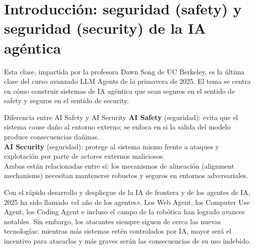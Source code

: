 \section{Introducción: seguridad (safety) y seguridad (security) de la IA agéntica}

Esta clase, impartida por la profesora Dawn Song de UC Berkeley, es la última clase del curso avanzado LLM Agents de la primavera de 2025. El tema se centra en cómo construir sistemas de IA agéntica que sean seguros en el sentido de safety y seguros en el sentido de security.

\begin{knowledgebox}{Diferencia entre AI Safety y AI Security}
\textbf{AI Safety} (seguridad): evita que el sistema cause daño al entorno externo; se enfoca en si la salida del modelo produce consecuencias dañinas.\\
\textbf{AI Security} (seguridad): protege al sistema mismo frente a ataques y explotación por parte de actores externos maliciosos.\\
Ambas están relacionadas entre sí: los mecanismos de alineación (alignment mechanisms) necesitan mantenerse robustos y seguros en entornos adversariales.
\end{knowledgebox}

Con el rápido desarrollo y despliegue de la IA de frontera y de los agentes de IA, 2025 ha sido llamado «el año de los agentes». Los Web Agent, los Computer Use Agent, los Coding Agent e incluso el campo de la robótica han logrado avances notables. Sin embargo, los atacantes siempre siguen de cerca las nuevas tecnologías: mientras más sistemas estén controlados por IA, mayor será el incentivo para atacarlos y más graves serán las consecuencias de su uso indebido.
